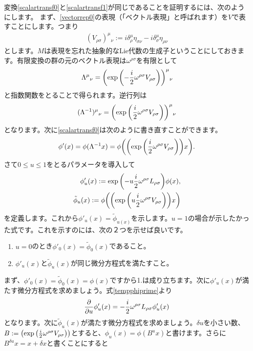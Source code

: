 \documentclass[report,paper=a4, fontsize=12pt, line_length=16cm, number_of_lines=33,dvipdfmx]{jlreq}
\numberwithin{equation}{chapter}
\newcommand{\phit}{\tilde{\phi}}
\begin{document}
変換\eqref{scalartransf0}と\eqref{scalartransf1}が同じであることを証明するには、次のようにします。
まず、\eqref{vectorrep0}の表現（「ベクトル表現」と呼ばれます）を$V$で表すことにします。つまり
\begin{align}
  (V_{\rho\sigma})^{\mu}{}_{\nu}:=i\delta^{\mu}_{\rho}\eta_{\sigma\nu}-i\delta^{\mu}_{\sigma}\eta_{\rho\nu}
\end{align}
とします。$M$は表現を忘れた抽象的なLie代数の生成子ということにしておきます。有限変換の群の元のベクトル表現は$\omega^{\rho\sigma}$を有限として
\begin{align}
  \Lambda^{\mu}{}_{\nu}=\qty(\exp\qty(-\frac{i}{2}\omega^{\rho\sigma}V_{\rho\sigma}))^{\mu}{}_{\nu}\label{finiteomega}
\end{align}
と指数関数をとることで得られます。逆行列は
\begin{align}
  (\Lambda^{-1})^{\mu}{}_{\nu}=\qty(\exp\qty(\frac{i}{2}\omega^{\rho\sigma}V_{\rho\sigma}))^{\mu}{}_{\nu} 
\end{align}
となります。次に\eqref{scalartransf0}は次のように書き直すことができます。
\begin{align}
  \phi'(x)=\phi(\Lambda^{-1}x)=\phi\qty(\qty(\exp\qty(\frac{i}{2}\omega^{\rho\sigma}V_{\rho\sigma}))x).
\end{align}
さて$0\le u \le 1$をとるパラメータを導入して
\begin{align}
  \phi'_{u}(x):=\exp\qty(-u\frac{i}{2}\omega^{\rho\sigma}L_{\rho\sigma})\phi(x),\label{tempphiprime}\\
  \phit_{u}(x):=\phi\qty(\qty(\exp\qty(u\frac{i}{2}\omega^{\rho\sigma}V_{\rho\sigma}))x)\label{tempphitilde}
\end{align}
を定義します。これから$\phi'_{u}(x)=\phit_{u(x)}$を示します。$u=1$の場合が示したかった式です。これを示すのには、次の２つを示せば良いです。
\begin{enumerate}
  \item $u=0$のとき$\phi'_{0}(x)=\phit_{0}(x)$であること。
  \item $\phi'_{u}(x)$と$\phit_{u}(x)$が同じ微分方程式を満たすこと。
\end{enumerate}
まず、$\phi'_{0}(x)=\phit_{0}(x)=\phi(x)$ですから1.は成り立ちます。次に$\phi'_{u}(x)$が満たす微分方程式を求めましょう。式\eqref{tempphiprime}より
\begin{align}
  \pdv{u} \phi'_{u}(x)=-\frac{i}{2}\omega^{\rho\sigma}L_{\rho\sigma}\phi'_{u}(x)\label{tempdiffeqprime}
\end{align}
となります。次に$\phit_{u}(x)$が満たす微分方程式を求めましょう。$\delta u$を小さい数、$B:=\qty(\exp\qty(\frac{i}{2}\omega^{\rho\sigma}V_{\rho\sigma}))$とすると、$\phi_u(x)=\phi(B^ux)$と書けます。さらに$B^{\delta u}x=x+\delta x$と書くことにすると
\end{document}
